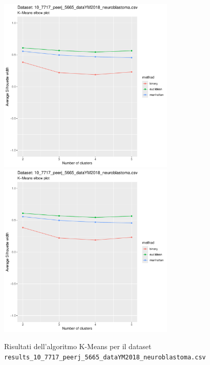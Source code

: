 \documentclass[12pt]{report}
\begin{document}
			\begin{figure}[h]
				\centering
				\includegraphics[width = 0.75\textwidth, height = 0.45\textheight, page = 1]{
					results/results_10_7717_peerj_5665_dataYM2018_neuroblastoma.csv.pdf
				}
				\includegraphics[width = 0.75\textwidth, height = 0.45\textheight, page = 2]{
					results/results_10_7717_peerj_5665_dataYM2018_neuroblastoma.csv.pdf
				}
				\caption{Risultati dell'algoritmo K-Means per il dataset
				\texttt{results\_10\_7717\_peerj\_5665\_dataYM2018\_neuroblastoma.csv}}
				\label{fig:kmeans3}
			\end{figure}
\end{document}
